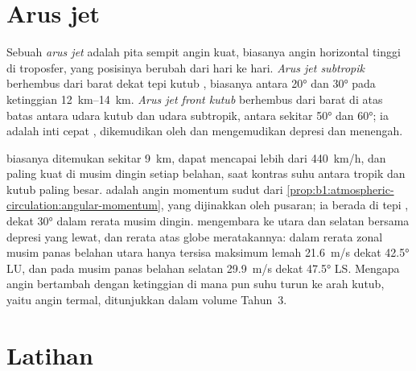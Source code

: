 \section{Arus jet}\label{sec:b1:atmospheric-circulation:jets}

\begin{definition}\label{def:b1:atmospheric-circulation:jet}
Sebuah \emph{arus jet} adalah pita sempit angin kuat, biasanya angin horizontal tinggi di troposfer, yang posisinya berubah dari hari ke hari. \emph{Arus jet subtropik} berhembus dari barat dekat tepi kutub , biasanya antara \ang{20} dan \ang{30}  pada ketinggian \qtyrange{12}{14}{km}. \emph{Arus jet front kutub} berhembus dari barat di atas batas antara udara kutub dan udara subtropik, antara sekitar \ang{50} dan \ang{60}; ia adalah inti cepat , dikemudikan oleh dan mengemudikan depresi dan   menengah.
\end{definition}

 biasanya ditemukan sekitar \qty{9}{km}, dapat mencapai lebih dari \qty{440}{km/h}, dan paling kuat di musim dingin setiap belahan, saat kontras suhu antara tropik dan kutub paling besar.  adalah angin momentum sudut dari \cref{prop:b1:atmospheric-circulation:angular-momentum}, yang dijinakkan oleh pusaran; ia berada di tepi , dekat \ang{30} dalam rerata musim dingin.  mengembara ke utara dan selatan bersama depresi yang lewat, dan rerata atas globe meratakannya: dalam rerata zonal musim panas belahan utara hanya tersisa maksimum lemah \qty{21.6}{m/s} dekat \ang{42.5} LU, dan pada musim panas belahan selatan \qty{29.9}{m/s} dekat \ang{47.5} LS. Mengapa angin bertambah dengan ketinggian di mana pun suhu turun ke arah kutub, yaitu angin termal, ditunjukkan dalam volume Tahun~3.

\section{Latihan}

